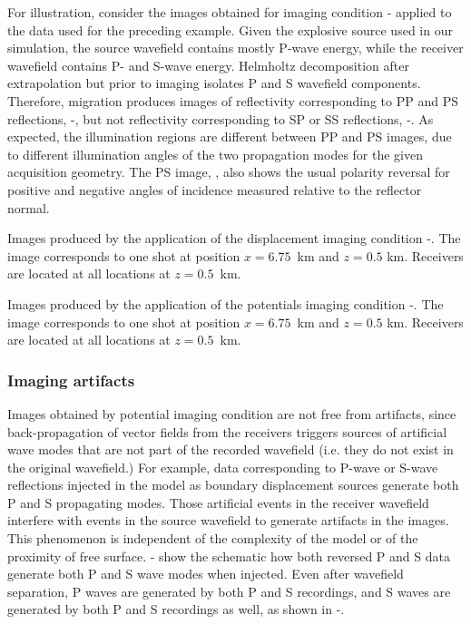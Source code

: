 For illustration, consider the images obtained for imaging condition - applied to the data used for the preceding  example. Given the explosive source used in our simulation, the source  wavefield contains mostly P-wave energy, while the receiver wavefield contains P- and S-wave energy. Helmholtz decomposition after extrapolation but prior to imaging isolates P and S wavefield components. Therefore, migration produces images of reflectivity corresponding to PP and PS reflections, -, but not reflectivity corresponding to SP or SS reflections, -. As expected, the illumination regions are different between PP and PS images, due to different illumination angles of the two propagation modes for the given acquisition geometry. The PS image, , also shows the usual polarity reversal for positive and negative angles of incidence measured relative to the reflector normal.



{Images produced by the application of the displacement imaging
condition -. The image corresponds to one shot
at position $x=6.75$~km and $z=0.5$ km. Receivers are located at all locations at
$z=0.5$~km.}

{Images produced by the application of the potentials imaging
condition -. The image corresponds to one shot
at position $x=6.75$~km and $z=0.5$ km.  Receivers are located at all locations at
$z=0.5$~km.}




\subsubsection{Imaging artifacts}
Images obtained by potential imaging condition are not free from artifacts, since back-propagation of vector fields from the receivers triggers sources of artificial wave modes that are not part of the recorded wavefield (i.e. they do not exist in the original wavefield.)
For example, data corresponding to P-wave or S-wave reflections injected in the model as boundary displacement sources generate both P and S propagating modes. Those artificial events in the receiver wavefield interfere with events in the source wavefield  to generate artifacts in the images. This phenomenon is independent of the complexity of the model or of the proximity of free surface. - show the schematic how both reversed P and S data generate both P and S wave modes when injected. Even after wavefield separation, P waves are generated by both P and S recordings, and S waves are generated by both P and S recordings as well, as shown in -.

